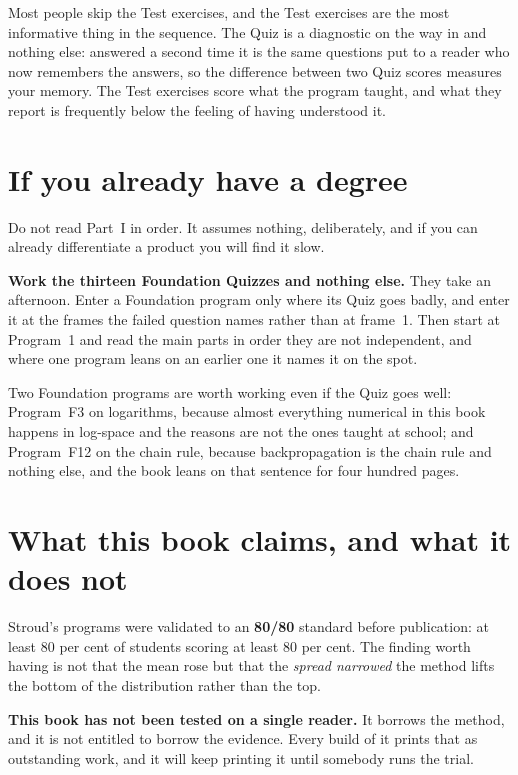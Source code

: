\noindent
Most people skip the Test exercises, and the Test exercises are the most
informative thing in the sequence. The Quiz is a diagnostic on the way in and
nothing else: answered a second time it is the same questions put to a reader
who now remembers the answers, so the difference between two Quiz scores
measures your memory. The Test exercises score what the program taught, and
what they report is frequently below the feeling of having understood it.

\section*{If you already have a degree}

Do not read Part~I in order. It assumes nothing, deliberately, and if you can
already differentiate a product you will find it slow.

\textbf{Work the thirteen Foundation Quizzes and nothing else.} They take an
afternoon. Enter a Foundation program only where its Quiz goes badly, and enter
it at the frames the failed question names rather than at frame~1. Then start
at Program~1 and read the main parts in order \dash{} they are not
independent, and where one program leans on an earlier one it names it on the
spot.

Two Foundation programs are worth working even if the Quiz goes well:
Program~F3 on logarithms, because almost everything numerical in this book
happens in log-space and the reasons are not the ones taught at school; and
Program~F12 on the chain rule, because backpropagation is the chain rule and
nothing else, and the book leans on that sentence for four hundred pages.

\section*{What this book claims, and what it does not}

\begin{note}
Stroud's programs were validated to an \textbf{80/80} standard before
publication: at least 80 per cent of students scoring at least 80 per cent. The
finding worth having is not that the mean rose but that the \emph{spread
narrowed} \dash{} the method lifts the bottom of the distribution rather than
the top.

\textbf{This book has not been tested on a single reader.} It borrows the
method, and it is not entitled to borrow the evidence. Every build of it prints
that as outstanding work, and it will keep printing it until somebody runs the
trial.
\end{note}

